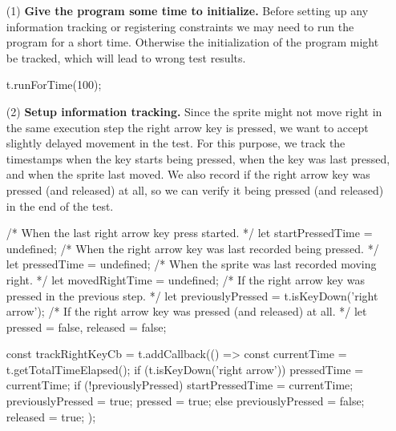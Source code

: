 \begin{enumerate}
    \item[(1)] \textbf{Give the program some time to initialize.}
        Before setting up any information tracking or registering constraints we may need to run the program for a short time.
        Otherwise the initialization of the program might be tracked, which will lead to wrong test results.
        \begin{javascriptcode}
            t.runForTime(100);
        \end{javascriptcode}
    \item[(2)] \textbf{Setup information tracking.}
        Since the sprite might not move right in the same execution step the right arrow key is pressed,
        we want to accept slightly delayed movement in the test.
        For this purpose, we track the timestamps when the key starts being pressed,
        when the key was last pressed, and when the sprite last moved.
        We also record if the right arrow key was pressed (and released) at all,
        so we can verify it being pressed (and released) in the end of the test.
        \begin{javascriptcode}
            /* When the last right arrow key press started. */
            let startPressedTime = undefined;
            /* When the right arrow key was last recorded being pressed. */
            let pressedTime = undefined;
            /* When the sprite was last recorded moving right. */
            let movedRightTime = undefined;
            /* If the right arrow key was pressed in the previous step. */
            let previouslyPressed = t.isKeyDown('right arrow');
            /* If the right arrow key was pressed (and released) at all. */
            let pressed = false, released = false;

            const trackRightKeyCb = t.addCallback(() => {
                const currentTime = t.getTotalTimeElapsed();
                if (t.isKeyDown('right arrow')) {
                    pressedTime = currentTime;
                    if (!previouslyPressed) {
                        startPressedTime = currentTime;
                    }
                    previouslyPressed = true;
                    pressed = true;
                } else {
                    previouslyPressed = false;
                    released = true;
                }
            });


\end{javascriptcode}
\end{enumerate}
